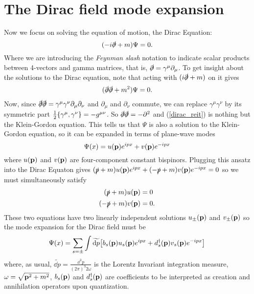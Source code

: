 \section{The Dirac field mode expansion}
Now we focus on solving the equation of motion, the Dirac Equation:
\begin{equation*}
    (-i\slashed{\partial}+m)\Psi=0.
\end{equation*}
Where we are introducing the \textit{Feynman slash} notation to indicate scalar products between 4-vectors and gamma matrices, that is, $\slashed{\partial}=\gamma^\mu\partial_\mu$. To get insight about the solutions to the Dirac equation, note that acting with $(i\slashed{\partial}+m)$ on it gives
\begin{equation}
    \begin{aligned}
        (\slashed{\partial}\slashed{\partial}+m^2)\Psi=0.
    \end{aligned}
    \label{dirac_reit}
\end{equation}
Now, since $\slashed{\partial}\slashed{\partial}=\gamma^\mu\gamma^\nu\partial_\mu\partial_\nu$ and $\partial_\mu$ and $\partial_\nu$ commute, we can replace $\gamma^\mu\gamma^\nu$ by its symmetric part $\frac{1}{2}\pb{\gamma^\mu}{\gamma^\nu}=-g^{\mu\nu}$. So $\slashed{\partial}\slashed{\partial}=- \partial^2$  and (\ref{dirac_reit}) is nothing but the Klein-Gordon equation. This tells us that $\Psi$ is also a solution to the Klein-Gordon equation, so it can be expanded in terms of plane-wave modes
\begin{equation}
    \Psi(x)=u(\vb{p})e^{ipx}+v(\vb{p})e^{-ipx}
\end{equation}
where $u(\vb{p})$ and $v(\vb{p})$ are four-component constant bispinors. Plugging this ansatz into the Dirac Equaton gives $(\slashed{p}+m)u(\vb{p})e^{ipx}+(-\slashed{p}+m)v(\vb{p})e^{-ipx}=0$ so we must simultaneously satisfy
\begin{equation}
\begin{aligned}
     (\slashed{p}+m)u(\vb{p})&=0\\
     (-\slashed{p}+m)v(\vb{p})&=0.
\end{aligned}
\label{uv}
\end{equation}
These two equations have two linearly independent solutions $u_{\pm}(\vb{p})$ and $v_{\pm}(\vb{p})$ so the mode expansion for the Dirac field must be
\begin{equation}
    \Psi(x)=\sum_{s=\pm}\int\widetilde{\dd p}\qty[b_s(\vb{p})u_s(\vb{p})e^{ipx}+d^\dagger_s(\vb{p})v_s(\vb{p})e^{-ipx}]
    \label{dirac_mode_expansion}
\end{equation}
where, as usual, $\widetilde{\dd p}=\frac{\dd^3 p}{(2\pi)^3 2\omega}$ is the Lorentz Invariant integration measure, $\omega=\sqrt{\vb{p}^2+m^2}$, $b_s(\vb{p})$ and $d^\dagger_s(\vb{p})$ are coefficients to be interpreted as creation and annihilation operators upon quantization.\\

